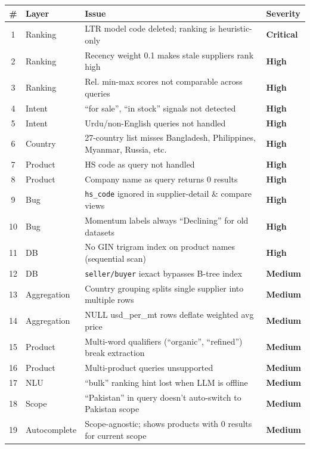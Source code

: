 \documentclass[12pt,a4paper]{article}
\newcommand{\cellWarn}[1]{\cellcolor{warningBg}\textcolor{zaraiAmber}{\textbf{#1}}}
\newcommand{\cellBad}[1]{\cellcolor{errorBg}\textcolor{zaraiRed}{\textbf{#1}}}
\begin{document}
\begin{longtable}{clp{7cm}l}
\toprule
\textbf{\#} & \textbf{Layer} & \textbf{Issue} & \textbf{Severity} \\
\midrule
\endhead
1 & Ranking & LTR model code deleted; ranking is heuristic-only & \cellBad{Critical} \\
2 & Ranking & Recency weight 0.1 makes stale suppliers rank high & \cellBad{High} \\
3 & Ranking & Rel. min-max scores not comparable across queries & \cellBad{High} \\
4 & Intent & ``for sale'', ``in stock'' signals not detected & \cellBad{High} \\
5 & Intent & Urdu/non-English queries not handled & \cellBad{High} \\
6 & Country & 27-country list misses Bangladesh, Philippines, Myanmar, Russia, etc. & \cellBad{High} \\
7 & Product & HS code as query not handled & \cellBad{High} \\
8 & Product & Company name as query returns 0 results & \cellBad{High} \\
9 & Bug & \texttt{hs\_code} ignored in supplier-detail \& compare views & \cellBad{High} \\
10 & Bug & Momentum labels always ``Declining'' for old datasets & \cellBad{High} \\
11 & DB & No GIN trigram index on product names (sequential scan) & \cellBad{High} \\
12 & DB & \texttt{seller/buyer} iexact bypasses B-tree index & \cellWarn{Medium} \\
13 & Aggregation & Country grouping splits single supplier into multiple rows & \cellWarn{Medium} \\
14 & Aggregation & NULL usd\_per\_mt rows deflate weighted avg price & \cellWarn{Medium} \\
15 & Product & Multi-word qualifiers (``organic'', ``refined'') break extraction & \cellWarn{Medium} \\
16 & Product & Multi-product queries unsupported & \cellWarn{Medium} \\
17 & NLU & ``bulk'' ranking hint lost when LLM is offline & \cellWarn{Medium} \\
18 & Scope & ``Pakistan'' in query doesn't auto-switch to Pakistan scope & \cellWarn{Medium} \\
19 & Autocomplete & Scope-agnostic; shows products with 0 results for current scope & \cellWarn{Medium} \\

\end{longtable}
\end{document}

